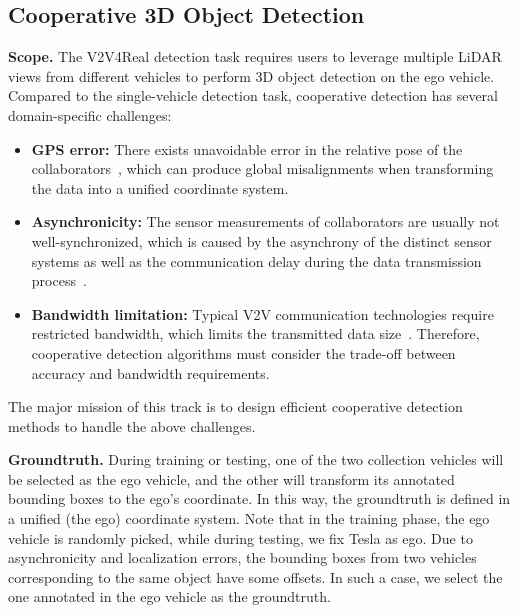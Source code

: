 \documentclass[10pt,twocolumn,letterpaper]{article}
\begin{document}
\subsection{Cooperative 3D Object Detection}
\noindent\textbf{Scope.} The V2V4Real detection task requires users to leverage multiple LiDAR views from different vehicles to perform 3D object detection on the ego vehicle. Compared to the single-vehicle detection task, cooperative detection has several domain-specific challenges:
\begin{itemize}
     \setlength{\parskip}{0pt}
  \setlength{\itemsep}{0pt plus 0pt}
    \item \textbf{GPS error:} There exists unavoidable error in the relative pose of the collaborators~\cite{liu2021automated}, which can produce global misalignments when transforming the data into a unified coordinate system. 
    \item \textbf{Asynchronicity:} The sensor measurements of collaborators are usually not well-synchronized, which is caused by the asynchrony of the distinct sensor systems as well as the communication delay during the data transmission process~\cite{xu2022v2xvit}.
    \item \textbf{Bandwidth limitation:} Typical V2V communication technologies require restricted bandwidth, which limits the transmitted data size~\cite{rawashdeh2018collaborative,xu2022v2xvit, wang2020v2vnet}. Therefore, cooperative detection algorithms must consider the trade-off between accuracy and bandwidth requirements.
\end{itemize}
The major mission of this track is to design efficient cooperative detection methods to handle the above challenges.


\noindent\textbf{Groundtruth.} During training or testing, one of the two collection vehicles will be selected as the ego vehicle, and the other will transform its annotated bounding boxes to the ego's coordinate. In this way, the groundtruth is defined in a unified (the ego) coordinate system. Note that in the training phase, the ego vehicle is randomly picked, while during testing, we fix Tesla as ego. Due to asynchronicity and localization errors, the bounding boxes from two vehicles corresponding to the same object have some offsets. In such a case, we select the one annotated in the ego vehicle as the groundtruth.
\end{document}
